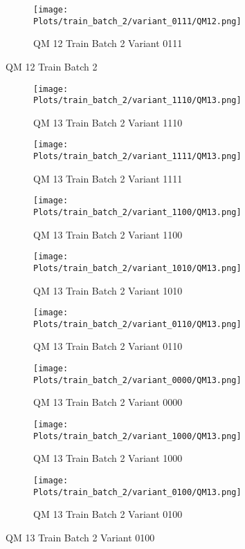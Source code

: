 \documentclass{DissertateFigs}
\begin{document}
\begin{figure}[t!]
\medskip

    \begin{subfigure}{0.47\textwidth}
    \texttt{[image: Plots/train\_batch\_2/variant\_0111/QM12.png]}
    \caption{QM 12 Train Batch 2 Variant 0111}
    \end{subfigure}
\caption{QM 12 Train Batch 2}
    \end{figure}
\clearpage
\begin{figure}[t!]
    \begin{subfigure}{0.47\textwidth}
    \texttt{[image: Plots/train\_batch\_2/variant\_1110/QM13.png]}
    \caption{QM 13 Train Batch 2 Variant 1110}
    \end{subfigure}
    \begin{subfigure}{0.47\textwidth}
    \texttt{[image: Plots/train\_batch\_2/variant\_1111/QM13.png]}
    \caption{QM 13 Train Batch 2 Variant 1111}
    \end{subfigure}

\medskip

    \begin{subfigure}{0.47\textwidth}
    \texttt{[image: Plots/train\_batch\_2/variant\_1100/QM13.png]}
    \caption{QM 13 Train Batch 2 Variant 1100}
    \end{subfigure}
    \begin{subfigure}{0.47\textwidth}
    \texttt{[image: Plots/train\_batch\_2/variant\_1010/QM13.png]}
    \caption{QM 13 Train Batch 2 Variant 1010}
    \end{subfigure}

\medskip

    \begin{subfigure}{0.47\textwidth}
    \texttt{[image: Plots/train\_batch\_2/variant\_0110/QM13.png]}
    \caption{QM 13 Train Batch 2 Variant 0110}
    \end{subfigure}
    \begin{subfigure}{0.47\textwidth}
    \texttt{[image: Plots/train\_batch\_2/variant\_0000/QM13.png]}
    \caption{QM 13 Train Batch 2 Variant 0000}
    \end{subfigure}

\medskip

    \begin{subfigure}{0.47\textwidth}
    \texttt{[image: Plots/train\_batch\_2/variant\_1000/QM13.png]}
    \caption{QM 13 Train Batch 2 Variant 1000}
    \end{subfigure}
    \begin{subfigure}{0.47\textwidth}
    \texttt{[image: Plots/train\_batch\_2/variant\_0100/QM13.png]}
    \caption{QM 13 Train Batch 2 Variant 0100}
    \end{subfigure}


\end{figure}
\end{document}
